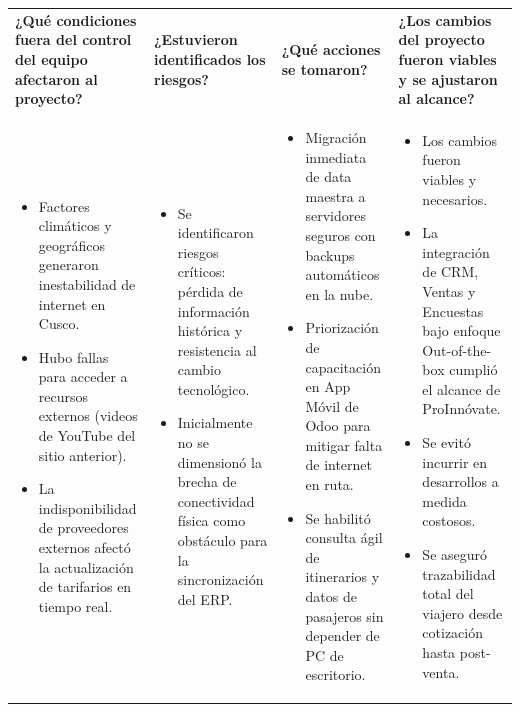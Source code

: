 \documentclass[11pt]{article}
\begin{document}
\begin{longtable}{|p{3.8cm}|p{3.8cm}|p{3.8cm}|p{3.8cm}|}
\rowcolor{RoundGray}\multicolumn{4}{|l|}{\textbf{Tercera Ronda}} \\ \hline
\rowcolor{HeaderGray}\textbf{¿Qué condiciones fuera del control del equipo afectaron al proyecto?} & \textbf{¿Estuvieron identificados los riesgos?} & \textbf{¿Qué acciones se tomaron?} & \textbf{¿Los cambios del proyecto fueron viables y se ajustaron al alcance?} \\ \hline
\begin{itemize}[leftmargin=*,nosep]
    \item Factores climáticos y geográficos generaron inestabilidad de internet en Cusco.
    \item Hubo fallas para acceder a recursos externos (videos de YouTube del sitio anterior).
    \item La indisponibilidad de proveedores externos afectó la actualización de tarifarios en tiempo real.
\end{itemize} &
\begin{itemize}[leftmargin=*,nosep]
    \item Se identificaron riesgos críticos: pérdida de información histórica y resistencia al cambio tecnológico.
    \item Inicialmente no se dimensionó la brecha de conectividad física como obstáculo para la sincronización del ERP.
\end{itemize} &
\begin{itemize}[leftmargin=*,nosep]
    \item Migración inmediata de data maestra a servidores seguros con backups automáticos en la nube.
    \item Priorización de capacitación en App Móvil de Odoo para mitigar falta de internet en ruta.
    \item Se habilitó consulta ágil de itinerarios y datos de pasajeros sin depender de PC de escritorio.
\end{itemize} &
\begin{itemize}[leftmargin=*,nosep]
    \item Los cambios fueron viables y necesarios.
    \item La integración de CRM, Ventas y Encuestas bajo enfoque Out-of-the-box cumplió el alcance de ProInnóvate.
    \item Se evitó incurrir en desarrollos a medida costosos.
    \item Se aseguró trazabilidad total del viajero desde cotización hasta post-venta.
\end{itemize} \\ \hline
\end{longtable}
\end{document}
